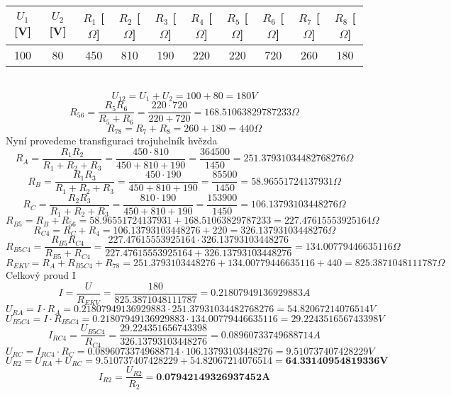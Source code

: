 \documentclass{article}
\begin{document}
\begin{tabular}{| c | c | c | c | c | c | c | c | c | c |}
  \hline
   $U_{1}$[V] & $U_{2}$ [V] & $R_{1}$ [$\Omega$]& $R_{2}$ [$\Omega$]& $R_{3}$ [$\Omega$]& $R_{4}$ [$\Omega$]& $R_{5}$ [$\Omega$]& $R_{6}$ [$\Omega$]& $R_{7}$ [$\Omega$]& $R_{8}$ [$\Omega$]\\
  \hline
  100 & 80 & 450 & 810 & 190 & 220 & 220 & 720 & 260 & 180\\
  \hline
\end{tabular}\\
\[
  U_{12} = U_{1} + U_{2} = 100 + 80 = 180V
\]
\[
  R_{56} = \displaystyle\frac{R_{5}R_{6}}{R_{5}+R_{6}}  = \displaystyle\frac{220 \cdot 720}{220 + 720} = 168.51063829787233 \Omega
\]
\[
  R_{78} = R_{7} + R_{8} = 260 + 180 = 440\Omega
\]
Nyní provedeme transfiguraci  trojuhelník hvězda
\[
  R_{A} = \displaystyle\frac{R_{1}R_{2}}{R_{1}+R_{2}+R_{3}}
  = \displaystyle\frac{450 \cdot 810}{450 + 810 + 190}
  = \displaystyle\frac{364500}{1450}
  = 251.37931034482768276 \Omega
\]
\[
  R_{B} = \displaystyle\frac{R_{1}R_{3}}{R_{1}+R_{2}+R_{3}}
  = \displaystyle\frac{450 \cdot 190}{450 + 810 + 190}
  = \displaystyle\frac{85500}{1450}
  = 58.96551724137931 \Omega
\]
\[
  R_{C} = \displaystyle\frac{R_{2}R_{3}}{R_{1}+R_{2}+R_{3}}
  = \displaystyle\frac{810 \cdot 190}{450 + 810 + 190}
  = \displaystyle\frac{153900}{1450}
  = 106.13793103448276 \Omega
\]
\[
  R_{B5} = R_{B} + R_{56} = 58.96551724137931 + 168.51063829787233 = 227.47615553925164 \Omega
\]
\[
  R_{C4} = R_{C} + R_{4} = 106.13793103448276 + 220 = 326.13793103448276 \Omega
\]
\[
  R_{B5C4} = \displaystyle\frac{R_{B5}R_{C4}}{R_{B5}+R_{C4}}
  = \displaystyle\frac{227.47615553925164 \cdot  326.13793103448276}{227.47615553925164 + 326.13793103448276}
  = 134.00779446635116 \Omega
\]
\[
  R_{EKV} = R_{A} + R_{B5C4} + R_{78} = 251.3793103448276 + 134.00779446635116 + 440
  = 825.3871048111787 \Omega
\]
Celkový proud I
\[
  I = \displaystyle\frac{U}{R_{EKV}} = \displaystyle\frac{180}{825.3871048111787} = 0.21807949136929883A
\]
\[
  U_{RA} = I \cdot R_A
  = 0.21807949136929883 \cdot 251.37931034482768276
  = 54.82067214076514V
\]
\[
  U_{B5C4} = I \cdot R_{B5C4}
 = 0.21807949136929883 \cdot 134.00779446635116
 = 29.224351656743398V
\]
\[
  I_{RC4} = \displaystyle\frac{U_{B5C4}}{R_{C4}} 
 = \displaystyle\frac{29.224351656743398}{326.13793103448276}
 = 0.08960733749688714 A
\] 
\[
  U_{RC} = I_{RC4} \cdot R_C
  = 0.08960733749688714  \cdot 106.13793103448276
  = 9.510737407428229 V
\]
\[
  U_{R2} = U_{RA} + U_{RC}
  = 9.510737407428229+54.82067214076514
  = \textbf{64.33140954819336V}
\]
\[
  I_{R2} = \displaystyle\frac{U_{R2}}{R_2}
  = \textbf{0.07942149326937452A}
\]
\end{document}
